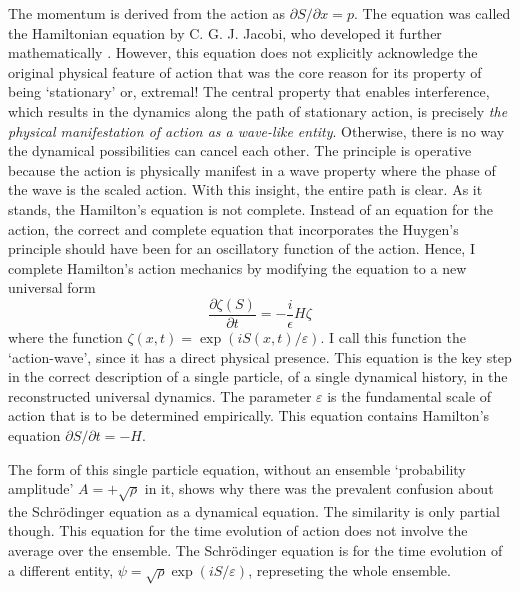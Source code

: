 The momentum is derived from the action as $\partial S/ \partial x = p$. The equation was called the
Hamiltonian equation by C. G. J. Jacobi, who developed it further mathematically \cite{chap14-key7}.
However, this equation does not explicitly acknowledge the original physical feature of action
that was the core reason for its property of being `stationary' or, extremal! The central
property that enables interference, which results in the dynamics along the path of stationary
action, is precisely \textit{the physical manifestation of action as a wave-like entity}. Otherwise, there
is no way the dynamical possibilities can cancel each other. The principle is operative because
the action is physically manifest in a wave property where the phase of the wave is the scaled
action. With this insight, the entire path is clear. As it stands, the Hamilton's equation
is not complete. Instead of an equation for the action, the correct and complete equation
that incorporates the Huygen's principle should have been for an oscillatory function of the
action. Hence, I complete Hamilton's action mechanics by modifying the equation to a new
universal form \cite{chap14-key2}
\begin{equation*}
\frac{\partial \zeta(S)}{\partial t} = - \frac{i}{\epsilon} H \zeta \tag{24}\label{c14-eq24}
\end{equation*}
where the function $\zeta(x, t) = \exp(iS(x, t)/\varepsilon)$. I call this function the `action-wave', since it
has a direct physical presence. This equation is the key step in the correct description of a
single particle, of a single dynamical history, in the reconstructed universal dynamics. The
parameter $\varepsilon$ is the fundamental scale of action that is to be determined empirically. This
equation contains Hamilton's equation $\partial S/\partial t = -H$.

The form of this single particle equation, without an ensemble `probability amplitude'
$A = + \sqrt{\rho}$ in it, shows why there was the prevalent confusion about the Schr\"{o}dinger equation
as a dynamical equation. The similarity is only partial though. This equation for the
time evolution of action does not involve the average over the ensemble. The Schr\"{o}dinger
equation is for the time evolution of a different entity, $\psi = \sqrt{\rho} \exp(iS/\varepsilon)$, represeting the
whole ensemble.

